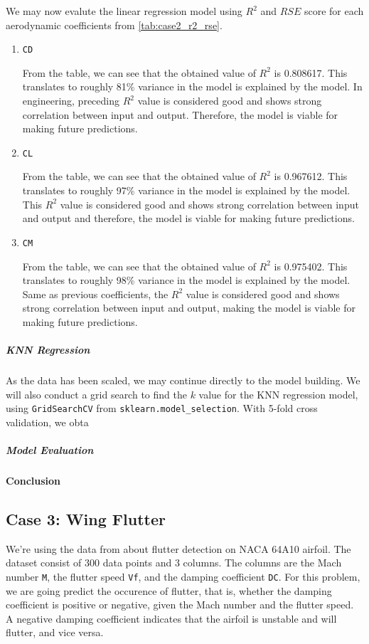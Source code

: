 \documentclass[conf]{new-aiaa}
\begin{document}
We may now evalute the linear regression model using $R^2$ and $RSE$ score for each aerodynamic coefficients from \ref{tab:case2_r2_rse}.
\begin{enumerate}
    \item \texttt{CD}
    
    From the table, we can see that the obtained value of $R^2$ is 0.808617. This translates to roughly 81\% variance in the model is explained by the model. In engineering, preceding $R^2$ value is considered good and shows strong correlation between input and output. Therefore, the model is viable for making future predictions.
    \item \texttt{CL}
    
    From the table, we can see that the obtained value of $R^2$ is 0.967612. This translates to roughly 97\% variance in the model is explained by the model. This $R^2$ value is considered good and shows strong correlation between input and output and therefore, the model is viable for making future predictions.
    \item \texttt{CM}
    
    From the table, we can see that the obtained value of $R^2$ is 0.975402. This translates to roughly 98\% variance in the model is explained by the model. Same as previous coefficients, the $R^2$ value is considered good and shows strong correlation between input and output, making the model is viable for making future predictions.
\end{enumerate}

\subparagraph{KNN Regression}
As the data has been scaled, we may continue directly to the model building. We will also conduct a grid search to find the $k$ value for the KNN regression model, using \texttt{GridSearchCV} from \texttt{sklearn.model\_selection}. With 5-fold cross validation, we obta

\subparagraph{Model Evaluation}

\paragraph{Conclusion}

\subsection{Case 3: Wing Flutter}
We're using the data from \cite{palar2023kernel} about flutter detection on NACA 64A10 airfoil. The dataset consist of 300 data points and 3 columns. The columns are the Mach number \texttt{M}, the flutter speed \texttt{Vf}, and the damping coefficient \texttt{DC}. For this problem, we are going predict the occurence of flutter, that is, whether the damping coefficient is positive or negative, given the Mach number and the flutter speed. A negative damping coefficient indicates that the airfoil is unstable and will flutter, and vice versa.
\end{document}
